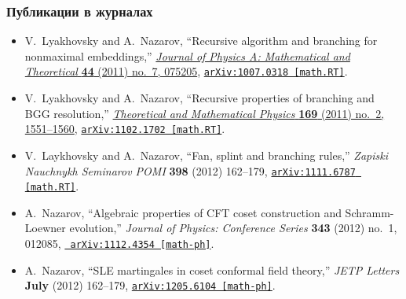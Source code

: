 \documentclass[pdftex]{beamer}
\theoremstyle{definition} \newtheorem{Def}{Определение}
\begin{document}
\begin{frame}
  \frametitle{Публикации в журналах}
  \begin{itemize}
  \item
    V.~{Lyakhovsky} and A.~{Nazarov}, ``{Recursive algorithm and branching for
      nonmaximal embeddings},''
    \href{http://dx.doi.org/10.1088/1751-8113/44/7/075205}{{\em Journal of
        Physics A: Mathematical and Theoretical} {\bf 44} (2011) no.~7, 075205},
    \href{http://arxiv.org/abs/1007.0318}{{\tt arXiv:1007.0318 [math.RT]}}.

  \item
    V.~{Lyakhovsky} and A.~{Nazarov}, ``{Recursive properties of branching and BGG
      resolution},'' \href{http://dx.doi.org/10.1007/s11232-011-0132-9}{{\em
        Theoretical and Mathematical Physics} {\bf 169} (2011) no.~2, 1551--1560},
    \href{http://arxiv.org/abs/1102.1702}{{\tt arXiv:1102.1702 [math.RT]}}.

  \item
    V.~{Laykhovsky} and A.~{Nazarov}, ``{Fan, splint and branching rules},'' {\em
      Zapiski Nauchnykh Seminarov POMI} {\bf 398} (2012)  162--179,
    \href{http://arxiv.org/abs/1111.6787}{{\tt arXiv:1111.6787 [math.RT]}}.

  \item
    A.~{Nazarov}, ``{Algebraic properties of CFT coset construction and
      Schramm-Loewner evolution},'' {\em Journal of Physics: Conference Series}
    {\bf 343} (2012) no.~1, 012085, \href{http://arxiv.org/abs/1112.4354}{{\tt
        arXiv:1112.4354 [math-ph]}}.
  \item
    A.~{Nazarov}, ``{SLE martingales in coset conformal field theory},''  {\em
      JETP Letters} {\bf July} (2012)  162--179,
    \href{http://arxiv.org/abs/1205.6104}{{\tt arXiv:1205.6104 [math-ph]}}.


  \end{itemize}
\end{frame}
\end{document}
